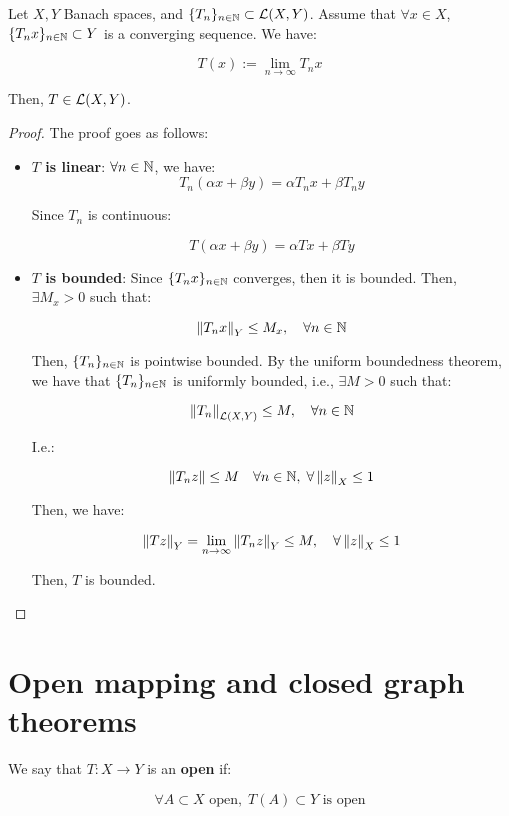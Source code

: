 \begin{fcorollary}
    Let $X, Y$ Banach spaces, and $\{T_n\}_{n \in \mathbb{N}} \subset \mathcal{L}(X, Y)$.
    Assume that $\forall x \in X$, $\{T_n x\}_{n \in \mathbb{N}} \subset Y$ is a 
    converging sequence. We have:

    $$T(x) := \lim_{n \to \infty} T_n x$$

    Then, $T \in \mathcal{L}(X, Y)$.
\end{fcorollary}

\begin{proof}
    The proof goes as follows:

    \begin{itemize}
        \item\textbf{$T$ is linear}: $\forall n \in \mathbb{N}$, we have:
        $$T_n(\alpha x + \beta y) = \alpha T_n x + \beta T_n y$$

        Since $T_n$ is continuous:

        $$T(\alpha x + \beta y) = \alpha Tx + \beta Ty$$

        \item \textbf{$T$ is bounded}: Since $\{T_n x\}_{n \in \mathbb{N}}$ converges, then it is bounded.
        Then, $\exists M_x > 0$ such that:

        $$\left\|T_n x\right\|_Y \leq M_x, \quad \forall n \in \mathbb{N}$$

        Then, $\{T_n\}_{n \in \mathbb{N}}$ is pointwise bounded. By the uniform boundedness theorem,
        we have that $\{T_n\}_{n \in \mathbb{N}}$ is uniformly bounded, i.e., $\exists M > 0$ such that:

        $$\left\|T_n\right\|_{\mathcal{L}(X, Y)} \leq M, \quad \forall n \in \mathbb{N}$$

        I.e.:

        $$\left\|T_n z\right\| \leq M \quad \forall n \in \mathbb{N}, \; \forall \left\|z\right\|_X \leq 1$$

        Then, we have:

        $$\left\|Tz\right\|_Y = \lim_{n \to \infty} \left\|T_n z\right\|_Y \leq M, \quad \forall \left\|z\right\|_X \leq 1$$

        Then, $T$ is bounded.

    \end{itemize}
\end{proof}

\section{Open mapping and closed graph theorems}

\begin{fdefinition}
    We say that $T: X \to Y$ is an \textbf{open} if:

    $$\forall A \subset X \text{ open}, \; T(A) \subset Y \text{ is open}$$
\end{fdefinition}

